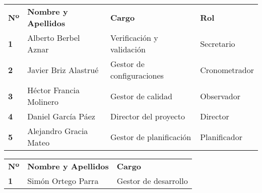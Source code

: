 \begin{longtable}{ | C{\tabcolsep} |
                     L{\tabcolsep} |
                     C{\tabcolsep} |
                     C{\tabcolsep} | }
\hline %
 \\
\hline %
{\bf Nº} & {\bf Nombre y Apellidos} & {\bf Cargo} & {\bf Rol} \\
\hline %
{\bf 1} & Alberto Berbel Aznar & Verificación y validación & Secretario  \\
\hline %
{\bf 2} & Javier Briz Alastrué & Gestor de configuraciones & Cronometrador  \\
\hline %
{\bf 3} & Héctor Francia Molinero & Gestor de calidad & Observador  \\
\hline %
{\bf 4} & Daniel García Páez & Director del proyecto & Director \\
\hline %
{\bf 5} & Alejandro Gracia Mateo & Gestor de planificación & Planificador  \\
\hline %
\end{longtable}


\begin{longtable}{ | C{\tabcolsep} |
                     L{\tabcolsep}  |
                     C{\tabcolsep} | }
\hline %
 \\ 
\hline %
{\bf Nº} & {\bf Nombre y Apellidos} & {\bf Cargo} \\
\hline %
{\bf 1} & Simón Ortego Parra & Gestor de desarrollo \\
\hline %
\end{longtable}



